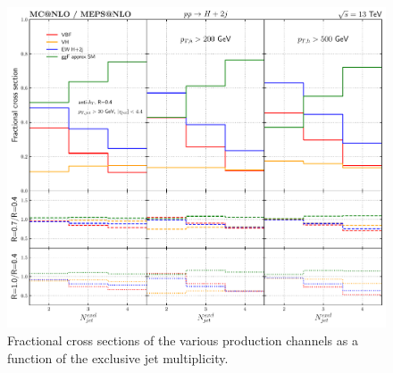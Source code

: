 \documentclass[10pt,prd,fleqn,superscriptaddress,notitlepage,nofootinbib,preprintnumbers,nobalancelastpage]{revtex4-1}
\begin{document}
\begin{figure}[p]
  \centering
  \includegraphics[width=.6\textwidth]{figures/vbf/njets.pdf}
\caption{Fractional cross sections of the various production channels as a function of the exclusive jet multiplicity. }
\label{fig:incl_njets_fraction}
\end{figure}
\end{document}

